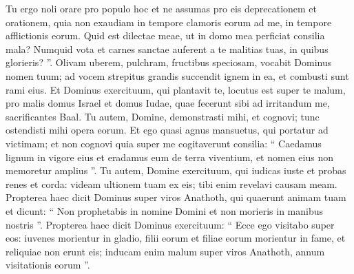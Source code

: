 \begin{biblechapter}
\begin{biblechapter}
\begin{biblechapter}
\begin{biblechapter}
\begin{biblechapter}
\begin{biblechapter}
\begin{biblechapter}
\begin{biblechapter}
\begin{biblechapter}
\begin{biblechapter}
\begin{biblechapter}
 \verse Tu ergo noli orare pro populo hoc et ne assumas pro eis deprecationem et orationem, quia non exaudiam in tempore clamoris eorum ad me, in tempore afflictionis eorum.
 \verse Quid est dilectae meae,
 ut in domo mea perficiat consilia mala?
 Numquid vota et carnes sanctae
 auferent a te malitias tuas,
 in quibus glorieris? ”.
 \verse Olivam uberem, pulchram, fructibus speciosam,
 vocabit Dominus nomen tuum;
 ad vocem strepitus grandis
 succendit ignem in ea,
 et combusti sunt rami eius.
 \verse Et Dominus exercituum, qui plantavit te, locutus est super te malum, pro malis domus Israel et domus Iudae, quae fecerunt sibi ad irritandum me, sacrificantes Baal.
 \verse Tu autem, Domine, demonstrasti mihi, et cognovi;
 tunc ostendisti mihi opera eorum.
 \verse Et ego quasi agnus mansuetus, qui portatur ad victimam; et non cognovi quia super me cogitaverunt consilia: “ Caedamus lignum in vigore eius et eradamus eum de terra viventium, et nomen eius non memoretur amplius ”.
 \verse Tu autem, Domine exercituum,
 qui iudicas iuste et probas renes et corda:
 videam ultionem tuam ex eis;
 tibi enim revelavi causam meam.
 \verse Propterea haec dicit Dominus super viros Anathoth, qui quaerunt animam tuam et dicunt: “ Non prophetabis in nomine Domini et non morieris in manibus nostris ”. 
\verse Propterea haec dicit Dominus exercituum: “ Ecce ego visitabo super eos: iuvenes morientur in gladio, filii eorum et filiae eorum morientur in fame, 
 \verse et reliquiae non erunt eis; inducam enim malum super viros Anathoth, annum visitationis eorum ”.
 

\end{biblechapter}
\end{biblechapter}
\end{biblechapter}
\end{biblechapter}
\end{biblechapter}
\end{biblechapter}
\end{biblechapter}
\end{biblechapter}
\end{biblechapter}
\end{biblechapter}
\end{biblechapter}
